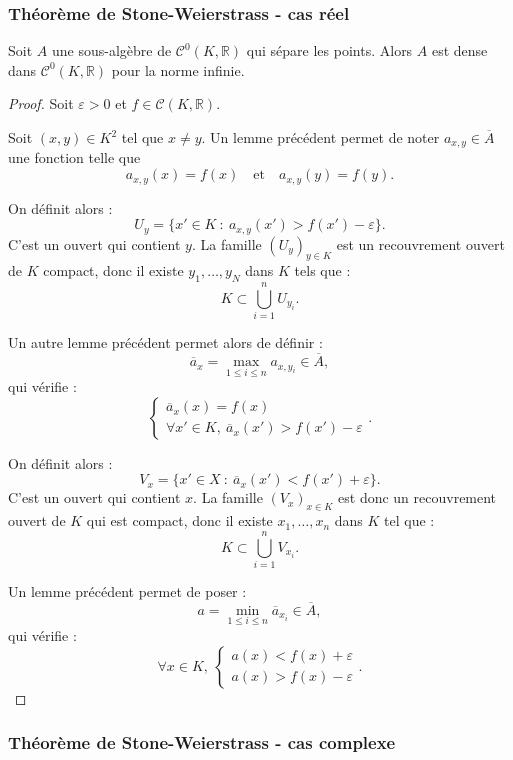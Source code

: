 \documentclass[french]{article}
\newcommand{\R}{\mathbb{R}}
\theoremstyle{plain}
\theoremstyle{definition}
\theoremstyle{remark}
\begin{document}
\subsubsection*{Théorème de Stone-Weierstrass - cas réel}

\begin{thm}%
	Soit $A$ une sous-algèbre de $\mathcal{C}^0(K,\R)$ qui sépare les points. Alors $A$ est dense dans $\mathcal{C}^0(K,\R)$ pour la norme infinie.
\end{thm}
\begin{proof}
	Soit $\varepsilon>0$ et $f\in\mathcal{C}(K,\R)$.
	
	Soit $(x,y)\in K^2$ tel que $x\ne y$. Un lemme précédent permet de noter $a_{x,y}\in\overline{A}$ une fonction telle que $$a_{x,y}(x)=f(x)\quad\text{et}\quad a_{x,y}(y)=f(y).$$
	
	On définit alors :
	$$U_y=\{x'\in K\ :\ a_{x,y}(x')>f(x')-\varepsilon\}.$$ C'est un ouvert qui contient $y$. La famille $(U_y)_{y\in K}$ est un recouvrement ouvert de $K$ compact, donc il existe $y_1,\ldots,y_N$ dans $K$ tels que :
	$$K\subset\bigcup_{i=1}^nU_{y_i}.$$
	
	Un autre lemme précédent permet alors de définir : 
	$$\overline{a}_x=\max_{1\leqslant i\leqslant n}a_{x,y_i}\in\overline{A},$$ qui vérifie :
	$$\begin{cases}
		\overline{a}_x(x)=f(x)\\
		\forall x'\in K,\ \overline{a}_x(x')>f(x')-\varepsilon
	\end{cases}.$$
	
	On définit alors :
	$$V_x=\{x'\in X\ :\ \overline{a}_x(x')<f(x')+\varepsilon\}.$$ C'est un ouvert qui contient $x$. La famille $(V_x)_{x\in K}$ est donc un recouvrement ouvert de $K$ qui est compact, donc il existe $x_1,\ldots,x_n$ dans $K$ tel que :
	$$K\subset \bigcup_{i=1}^nV_{x_i}.$$
	
	Un lemme précédent permet de poser :
	$$a=\min_{1\leqslant i\leqslant n}\overline{a}_{x_i}\in\overline{A},$$ qui vérifie :
	$$\forall x\in K,\ \begin{cases}
		a(x)<f(x)+\varepsilon\\
		a(x)>f(x)-\varepsilon
	\end{cases}.$$
\end{proof}

\subsubsection*{Théorème de Stone-Weierstrass - cas complexe}
\end{document}
